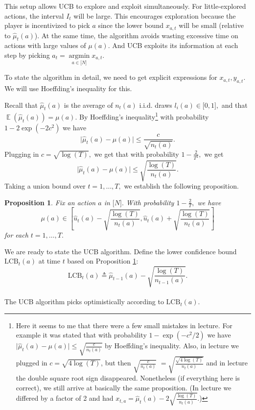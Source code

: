 \documentclass[11pt]{article}
\newtheorem{prop}{Proposition}
\newcommand{\bN}{\lbrack N \rbrack}
\newcommand{\E}{\mathop{{}\mathbb{E}}}
\DeclareMathOperator*{\argmin}{argmin}
\begin{document}
This setup allows UCB to explore and exploit simultaneously. For little-explored actions, the interval $I_t$ will be large. This encourages exploration because the player is incentivized to pick $a$ since the lower bound $x_{a,t}$ will be small (relative to $\hat{\mu}_t(a)$). At the same time, the algorithm avoids wasting excessive time on actions with large values of $\mu(a)$. And UCB exploits its information at each step by picking $a_t = \argmin\limits_{a \in \bN} x_{a,t}. $

To state the algorithm in detail, we need to get explicit expressions for $x_{a,t},y_{a,t}$. We will use Hoeffding's inequality for this. 

Recall that $\hat{\mu}_t(a)$ is the average of $n_t(a)$ i.i.d. draws $l_i(a) \in \lbrack 0,1 \rbrack,$ and that $\E(\hat{\mu}_t(a)) = \mu(a).$ By Hoeffding's inequality\footnote{Here it seems to me that there were a few small mistakes in lecture. For example it was stated that with probability $1-\exp(-c^2/2)$ we have $\lvert \hat{\mu}_t(a) - \mu(a) \rvert \leq \sqrt{\frac{c}{n_t(a)}}$ by Hoeffding's inequality. Also, in lecture we plugged in $c=\sqrt{4\log(T)}$, but then $\sqrt{\frac{c}{n_t(a)}}$  $= \sqrt{\frac{\sqrt{4\log(T)}}{n_t(a)}}$ and in lecture the double square root sign disappeared. Nonetheless (if everything here is correct), we still arrive at basically the same proposition. (In lecture we differed by a factor of 2 and had $x_{t,a} = \hat{\mu}_t(a) - 2\sqrt{\frac{\log(T)}{n_t(a)}}$.)} with probability $1-2\exp(-2c^2)$ we have \[\lvert \hat{\mu}_t(a) - \mu(a) \rvert \leq \frac{c}{\sqrt{n_t(a)}}.\] Plugging in $c=\sqrt{\log(T)},$ we get that with probability $1-\frac{2}{T^2},$ we get \[\lvert \hat{\mu}_t(a) - \mu(a) \rvert \leq \sqrt{\frac{\log(T)}{n_t(a)}}.\] Taking a union bound over $t=1,\ldots, T,$ we establish the following proposition.

\begin{prop} \label{prop:ucb}
Fix an action $a$ in $\bN.$ With probability $1-\frac{2}{T},$ we have \[\mu(a) \in \left\lbrack \hat{u}_t(a)-\sqrt{\frac{\log(T)}{n_t(a)}}, \hat{u}_t(a)+\sqrt{\frac{\log(T)}{n_t(a)}}\right\rbrack\]
for each $t=1,\ldots,T.$
\end{prop} We are ready to state the UCB algorithm. Define the lower confidence bound $\text{LCB}_t(a)$ at time $t$ based on Proposition \ref{prop:ucb}: \[\text{LCB}_t(a) \triangleq \hat{\mu}_{t-1}(a) -  \sqrt{\frac{\log(T)}{n_{t-1}(a)}}.\]\\
The UCB algorithm picks optimistically according to $\text{LCB}_t(a).$ \\
\end{document}
